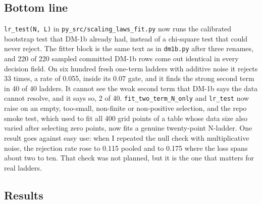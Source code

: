 
\subsection*{Bottom line}

\texttt{lr\_\allowbreak{}test(N, L)} in \texttt{py\_\allowbreak{}src/\allowbreak{}scaling\_\allowbreak{}laws\_\allowbreak{}fit.py} now runs the calibrated bootstrap test that DM-1b already had, instead of a chi-square test that could never reject. The fitter block is the same text as in \texttt{dm1b.py} after three renames, and 220 of 220 sampled committed DM-1b rows come out identical in every decision field. On six hundred fresh one-term ladders with additive noise it rejects 33 times, a rate of 0.055, inside its 0.07 gate, and it finds the strong second term in 40 of 40 ladders. It cannot see the weak second term that DM-1b says the data cannot resolve, and it says so, 2 of 40. \texttt{fit\_\allowbreak{}two\_\allowbreak{}term\_\allowbreak{}N\_\allowbreak{}only} and \texttt{lr\_\allowbreak{}test} now raise on an empty, too-small, non-finite or non-positive selection, and the repo smoke test, which used to fit all 400 grid points of a table whose data size also varied after selecting zero points, now fits a genuine twenty-point N-ladder. One result goes against easy use: when I repeated the null check with multiplicative noise, the rejection rate rose to 0.115 pooled and to 0.175 where the loss spans about two to ten. That check was not planned, but it is the one that matters for real ladders.


\subsection*{Results}


